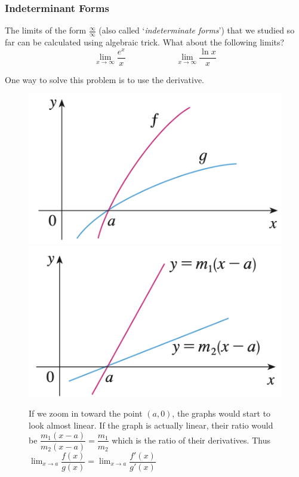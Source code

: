 \documentclass[t]{beamer}
\theoremstyle{plain}
\theoremstyle{definition}
\newcommand{\ds}{\displaystyle}
\newcommand{\limm}[1]{\displaystyle \lim_{x\to #1}}
\begin{document}
\begin{frame}
\frametitle{Indeterminant Forms}

\footnotesize

\noindent The limits of the form $\frac{\infty}{\infty}$ (also called `\textit{indeterminate forms}') that we studied so far can be calculated using algebraic trick.   What about the following limits?
\[\lim_{x\to\infty}\frac{e^x}{x} \qquad\qquad\qquad \ds\lim_{x\to\infty}\frac{\ln x}{x}\]

\noindent One way to solve this problem is to use the derivative. 

\begin{figure}[t]
\begin{center}
\includegraphics[scale=0.2]{fig/hospital1}
\includegraphics[scale=0.2]{fig/hospital2}
\caption{If we zoom in toward the point $(a, 0)$, the graphs would start to look almost linear.  If the graph is actually linear, their ratio would be $\dfrac{m_1(x-a)}{m_2(x-a)} = \dfrac{m_1}{m_2}$ which is the ratio of their derivatives.  Thus  $\limm{a}\dfrac{f(x)}{g(x)} = \limm{a}\dfrac{f'(x)}{g'(x)} $}
\end{center}
\end{figure}


\end{frame}
\end{document}
